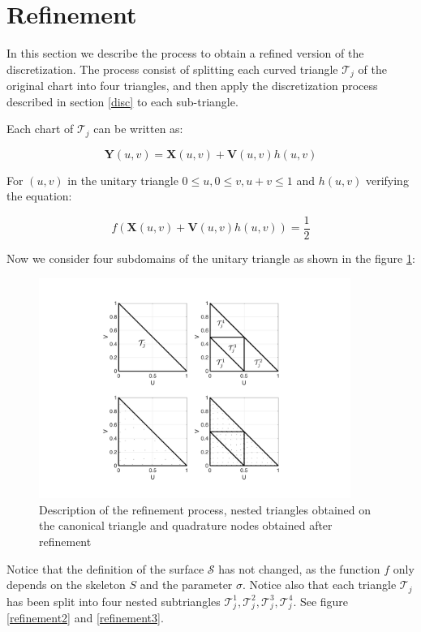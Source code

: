 \documentclass[11pt, oneside]{article}
\newcommand\bX{\boldsymbol X}
\newcommand\bY{\boldsymbol Y}
\newcommand\bV{\boldsymbol V}
\begin{document}
\section{Refinement}

In this section we describe the process to obtain a refined version of the discretization. The process consist of splitting each curved triangle  $\mathcal{T}_j$ of the original chart into four triangles, and then apply the discretization process described in section \ref{disc} to each sub-triangle.

Each chart of $\mathcal{T}_j$ can be written as:

\begin{equation}
\bY(u,v)=\bX(u,v)+\bV(u,v)h(u,v)
\end{equation}

For $(u,v)$ in the unitary triangle $0\le u, 0\le v, u+v\le1$ and $h(u,v)$ verifying the equation:

\begin{equation}
f(\bX(u,v)+\bV(u,v)h(u,v))=\frac{1}{2}
\end{equation}

Now we consider four subdomains of the unitary triangle as shown in the figure \ref{refinement1}:

\begin{figure}[H]
\begin{center}
\includegraphics[width=4in]{Triangle_Refine_v2.pdf}
\end{center}
\caption{Description of the refinement process, nested triangles obtained on the canonical triangle and quadrature nodes obtained after refinement}
\label{refinement1}
\end{figure}

Notice that the definition of the surface $\mathcal{S}$ has not changed, as the function $f$ only depends on the skeleton $\mathit{S}$ and the parameter $\sigma$. Notice also that each triangle $\mathcal{T}_j$ has been split into four nested subtriangles $\mathcal{T}_j^1,\mathcal{T}_j^2,\mathcal{T}_j^3,\mathcal{T}_j^4$. See figure \ref{refinement2} and \ref{refinement3}.
\end{document}
